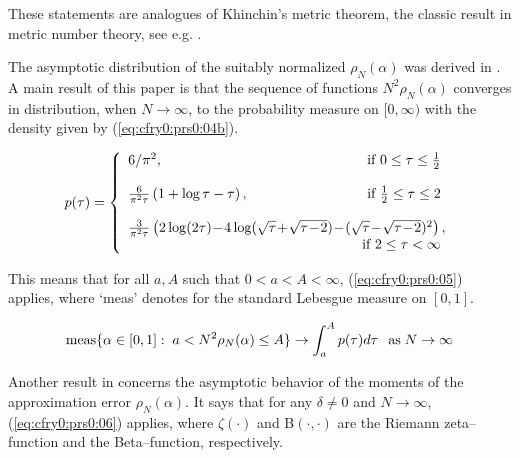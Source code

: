 These statements are analogues of Khinchin's metric theorem,
the classic result
in metric number theory, see e.g. \cite{bibref:b:Harman}.

The asymptotic distribution of the suitably normalized
$\rho_N(\alpha)$
was derived in  \cite{bibref:p:KargaevZ1}.  A main result of this
paper is that
the sequence of functions
$N^2\rho_N(\alpha)$ converges in distribution, when $N\rightarrow
\infty$,
to the probability measure on $[0, \infty)$ with the density given
by (\ref{eq:cfry0:prs0:04b}).

\begin{equation}
\label{eq:cfry0:prs0:04b}
{p}(\tau) =
\left\{\begin{array}{l}
                 6/\pi^2, \hfill\mbox{ if $0 \leq \tau \leq \frac{1}{2}$ }\\
                 \\
                 \frac{6}{\pi^2 \tau} \left(1 + \log \tau - \tau
               \right), \hfill\mbox{ if $\frac{1}{2}\leq \tau\leq 2 $ } \\
                 \\
               \frac{ 3}{\pi^2 \tau}\left(2\log(2 \tau)\!
               -\!4\log(\sqrt{\tau}\!+\!\sqrt{\tau\!-\!2})\!
               -\! (\sqrt{\tau}\!-\!\sqrt{\tau\!-\!2})^2 \right),
                             \\
                             \hfill \mbox{ if $2 \leq \tau < \infty  $ } \\
                  \end{array}
             \right.
\end{equation}

This means that
for all $a,A$
such that
 $0<a<A<\infty$,
(\ref{eq:cfry0:prs0:05}) applies,
where
{\rm `meas'} denotes for the standard Lebesgue measure on $[0,1]$.

\begin{equation}
\label{eq:cfry0:prs0:05}
{\rm meas}  \{ \alpha \in [0,1]: \;a < N^2 \rho_N(\alpha) \leq A \}
\rightarrow
\int_a^A {p}(\tau) d \tau\,
\;\;{\rm as}\; N \rightarrow \infty
\end{equation}

Another  result in \cite{bibref:p:KargaevZ1} concerns the asymptotic
behavior
of the moments of the approximation error $\rho_N(\alpha) $. It
says that
for any $\delta\neq 0$ and $N \rightarrow \infty$,
(\ref{eq:cfry0:prs0:06}) applies,
 where  $\zeta(\cdot)$ and B$(\cdot,\cdot)$
are the Riemann zeta--function and the Beta--function,
respectively.

